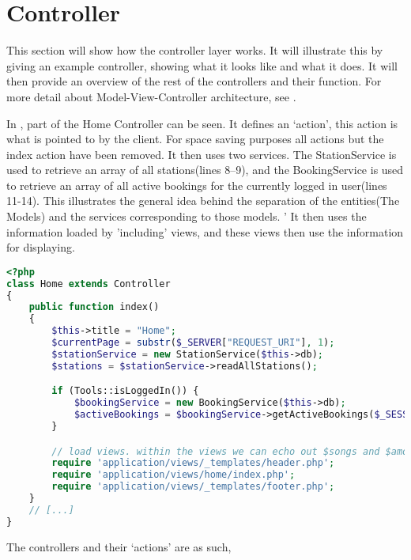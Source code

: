 \section{Controller}
This section will show how the controller layer works. 
It will illustrate this by giving an example controller, showing what it looks like and what it does.
It will then provide an overview of the rest of the controllers and their function.
For more detail about Model-View-Controller architecture, see .

In , part of the Home Controller can be seen. 
It defines an `action', this action is what is pointed to by the client. 
For space saving purposes all actions but the index action have been removed.
It then uses two services. 
The StationService is used to retrieve an array of all stations(lines 8--9), and the BookingService is used to retrieve an array of all active bookings for the currently logged in user(lines 11-14). 
This illustrates the general idea behind the separation of the entities(The Models) and the services corresponding to those models. '
It then uses the information loaded by 'including' views, and these views then use the information for displaying.

\begin{lstlisting}[language=php, label=lst:homeController, caption={Home Controller Class}]
<?php
class Home extends Controller
{
    public function index()
    {
        $this->title = "Home";
        $currentPage = substr($_SERVER["REQUEST_URI"], 1);
        $stationService = new StationService($this->db);
        $stations = $stationService->readAllStations();

        if (Tools::isLoggedIn()) {
            $bookingService = new BookingService($this->db);
            $activeBookings = $bookingService->getActiveBookings($_SESSION["login_user"]);
        }

        // load views. within the views we can echo out $songs and $amount_of_songs easily
        require 'application/views/_templates/header.php';
        require 'application/views/home/index.php';
        require 'application/views/_templates/footer.php';
    }
    // [...]
}
\end{lstlisting}

The controllers and their `actions' are as such,

